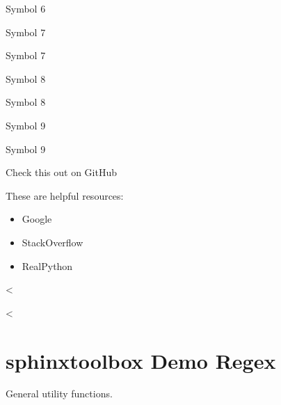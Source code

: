 \documentclass[letterpaper,10pt,english]{sphinxmanual}
\newcommand\thesymbolfootnote{\fnsymbol{footnote}}\let\thenumberfootnote\thefootnote
\begin{document}
\begin{DUlineblock}{0em}
\renewcommand\thefootnote{\thesymbolfootnote}\begin{footnote}[7]\sphinxAtStartFootnote
Symbol 6
%
\end{footnote}\renewcommand\thefootnote{\thenumberfootnote}
\item[] Symbol 7 %
\renewcommand\thefootnote{\thesymbolfootnote}\begin{footnote}[8]\sphinxAtStartFootnote
Symbol 7
%
\end{footnote}\renewcommand\thefootnote{\thenumberfootnote}
\item[] Symbol 8 %
\renewcommand\thefootnote{\thesymbolfootnote}\begin{footnote}[9]\sphinxAtStartFootnote
Symbol 8
%
\end{footnote}\renewcommand\thefootnote{\thenumberfootnote}
\item[] Symbol 9 %
\renewcommand\thefootnote{\thesymbolfootnote}\begin{footnote}[10]\sphinxAtStartFootnote
Symbol 9
%
\end{footnote}\renewcommand\thefootnote{\thenumberfootnote}
\end{DUlineblock}


\vspace{20px}



Check this out on GitHub




\nopagebreak


These are helpful resources:
\begin{itemize}
\item {}
Google

\item {}
StackOverflow

\item {}
RealPython

\end{itemize}

<%

\sphinxstepscope<%


\chapter{sphinx\sphinxhyphen{}toolbox Demo \sphinxhyphen{} Regex}
\label{\detokenize{regex:module-sphinx_toolbox.utils}}\label{\detokenize{regex:sphinx-toolbox-demo-regex}}\label{\detokenize{regex::doc}}
General utility functions.
\end{document}
